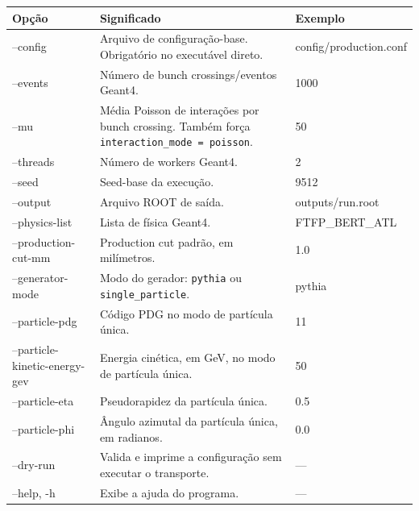 \documentclass[11pt,a4paper]{article}
\begin{document}
\begin{longtable}{>{\ttfamily}p{4.5cm} p{7.6cm} p{3.0cm}}
\toprule
\textnormal{Opção} & Significado & Exemplo \\
\midrule
\endhead

--config &
Arquivo de configuração-base. Obrigatório no executável direto. &
config/production.conf \\

--events &
Número de bunch crossings/eventos Geant4. &
1000 \\

--mu &
Média Poisson de interações por bunch crossing. Também força
\texttt{interaction\_mode = poisson}. &
50 \\

--threads &
Número de workers Geant4. &
2 \\

--seed &
Seed-base da execução. &
9512 \\

--output &
Arquivo ROOT de saída. &
outputs/run.root \\

--physics-list &
Lista de física Geant4. &
FTFP\_BERT\_ATL \\

--production-cut-mm &
Production cut padrão, em milímetros. &
1.0 \\

--generator-mode &
Modo do gerador: \texttt{pythia} ou \texttt{single\_particle}. &
pythia \\

--particle-pdg &
Código PDG no modo de partícula única. &
11 \\

--particle-kinetic-energy-gev &
Energia cinética, em GeV, no modo de partícula única. &
50 \\

--particle-eta &
Pseudorapidez da partícula única. &
0.5 \\

--particle-phi &
Ângulo azimutal da partícula única, em radianos. &
0.0 \\

--dry-run &
Valida e imprime a configuração sem executar o transporte. &
--- \\

--help, -h &
Exibe a ajuda do programa. &
--- \\

\bottomrule
\end{longtable}
\end{document}
